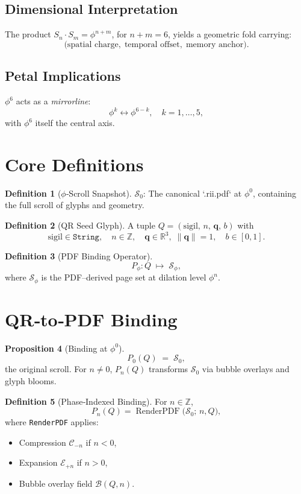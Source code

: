 \documentclass[12pt]{article}
\theoremstyle{definition}
\newtheorem{definition}{Definition}[section]
\newtheorem{proposition}[definition]{Proposition}
\begin{document}
\subsection*{Dimensional Interpretation}
The product $S_n\cdot S_m=\phi^{n+m}$, for $n+m=6$, yields a geometric fold carrying:
\[
\bigl(\text{spatial charge},\;\text{temporal offset},\;\text{memory anchor}\bigr).
\]

\subsection*{Petal Implications}
$\phi^6$ acts as a \emph{mirrorline}:
\[
\phi^k \longleftrightarrow \phi^{6-k},\quad k=1,\dots,5,
\]
with $\phi^6$ itself the central axis.

\section{Core Definitions}

\begin{definition}[$\phi$‑Scroll Snapshot]
$\mathcal{S}_0$: The canonical `.rii.pdf` at $\phi^0$, containing the full scroll of glyphs and geometry.
\end{definition}

\begin{definition}[QR Seed Glyph]
A tuple $Q=(\mathrm{sigil},\,n,\,\mathbf{q},\,b)$ with
\[
\mathrm{sigil}\in\texttt{String},\quad
n\in\mathbb{Z},\quad
\mathbf{q}\in\mathbb{R}^3,\;\|\mathbf{q}\|=1,\quad
b\in[0,1].
\]
\end{definition}

\begin{definition}[PDF Binding Operator]
\[
P_{\phi}: Q \;\longmapsto\; \mathcal{S}_{\phi},
\]
where $\mathcal{S}_{\phi}$ is the PDF–derived page set at dilation level $\phi^n$.
\end{definition}

\section{QR‑to‑PDF Binding}

\begin{proposition}[Binding at $\phi^0$]
\[
P_0(Q)\;=\;\mathcal{S}_0,
\]
the original scroll. For $n\neq0$, $P_n(Q)$ transforms $\mathcal{S}_0$ via bubble overlays and glyph blooms.
\end{proposition}

\begin{definition}[Phase‑Indexed Binding]
For $n\in\mathbb{Z}$,
\[
P_n(Q)
=\operatorname{RenderPDF}\bigl(\mathcal{S}_0;\,n,Q\bigr),
\]
where \texttt{RenderPDF} applies:
\begin{itemize}
  \item Compression $\mathcal{C}_{-n}$ if $n<0$,
  \item Expansion $\mathcal{E}_{+n}$ if $n>0$,
  \item Bubble overlay field $\mathcal{B}(Q,n)$.
\end{itemize}
\end{definition}
\end{document}
